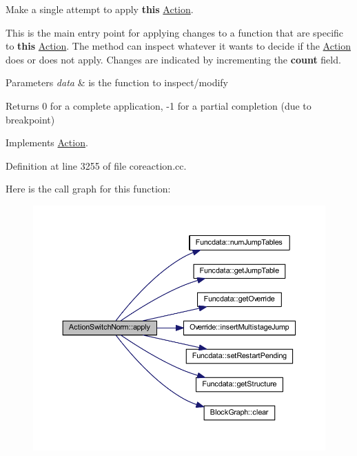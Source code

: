 Make a single attempt to apply {\bfseries{this}} \mbox{\hyperlink{class_action}{Action}}. 

This is the main entry point for applying changes to a function that are specific to {\bfseries{this}} \mbox{\hyperlink{class_action}{Action}}. The method can inspect whatever it wants to decide if the \mbox{\hyperlink{class_action}{Action}} does or does not apply. Changes are indicated by incrementing the {\bfseries{count}} field. 
\begin{DoxyParams}{Parameters}
{\em data} & is the function to inspect/modify \\
\hline
\end{DoxyParams}
\begin{DoxyReturn}{Returns}
0 for a complete application, -\/1 for a partial completion (due to breakpoint) 
\end{DoxyReturn}


Implements \mbox{\hyperlink{class_action_aac1c3999d6c685b15f5d9765a4d04173}{Action}}.



Definition at line 3255 of file coreaction.\+cc.

Here is the call graph for this function\+:
\nopagebreak
\begin{figure}[H]
\begin{center}
\leavevmode
\includegraphics[width=350pt]{class_action_switch_norm_afbafe42ea6a6c25321775656d0a1f6cb_cgraph}
\end{center}
\end{figure}
\mbox{\label{class_action_switch_norm_a006f767268c4794b34b61face5a620cd}} 
